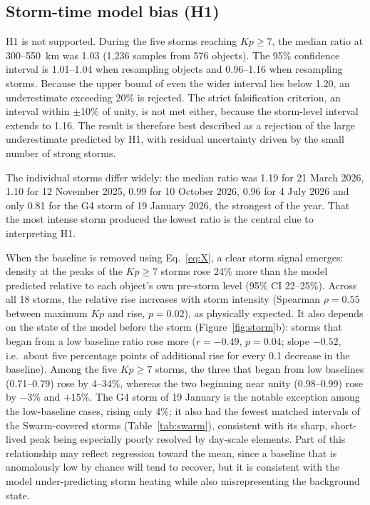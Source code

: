 \documentclass[11pt]{article}
\newcommand{\Kp}{\mathit{Kp}}
\begin{document}
\subsection{Storm-time model bias (H1)}
H1 is not supported. During the five storms reaching $\Kp \geq 7$, the median ratio at 300--550~km was 1.03 (1,236 samples from 576 objects). The 95\% confidence interval is 1.01--1.04 when resampling objects and 0.96--1.16 when resampling storms. Because the upper bound of even the wider interval lies below 1.20, an underestimate exceeding 20\% is rejected. The strict falsification criterion, an interval within $\pm$10\% of unity, is not met either, because the storm-level interval extends to 1.16. The result is therefore best described as a rejection of the large underestimate predicted by H1, with residual uncertainty driven by the small number of strong storms.

The individual storms differ widely: the median ratio was 1.19 for 21 March 2026, 1.10 for 12 November 2025, 0.99 for 10 October 2026, 0.96 for 4 July 2026 and only 0.81 for the G4 storm of 19 January 2026, the strongest of the year. That the most intense storm produced the lowest ratio is the central clue to interpreting H1.

When the baseline is removed using Eq.~\eqref{eq:X}, a clear storm signal emerges: density at the peaks of the $\Kp \geq 7$ storms rose 24\% more than the model predicted relative to each object's own pre-storm level (95\% CI 22--25\%). Across all 18 storms, the relative rise increases with storm intensity (Spearman $\rho = 0.55$ between maximum $\Kp$ and rise, $p = 0.02$), as physically expected. It also depends on the state of the model before the storm (Figure~\ref{fig:storm}b): storms that began from a low baseline ratio rose more ($r = -0.49$, $p = 0.04$; slope $-0.52$, i.e.\ about five percentage points of additional rise for every 0.1 decrease in the baseline). Among the five $\Kp \geq 7$ storms, the three that began from low baselines (0.71--0.79) rose by 4--34\%, whereas the two beginning near unity (0.98--0.99) rose by $-3$\% and $+15$\%. The G4 storm of 19 January is the notable exception among the low-baseline cases, rising only 4\%; it also had the fewest matched intervals of the Swarm-covered storms (Table~\ref{tab:swarm}), consistent with its sharp, short-lived peak being especially poorly resolved by day-scale elements. Part of this relationship may reflect regression toward the mean, since a baseline that is anomalously low by chance will tend to recover, but it is consistent with the model under-predicting storm heating while also misrepresenting the background state.
\end{document}
